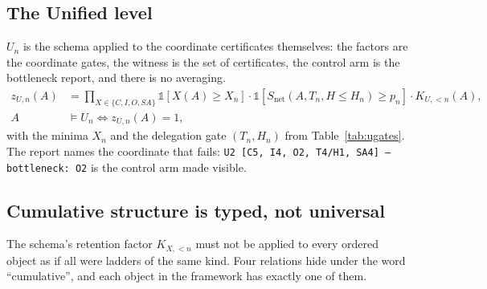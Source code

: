 \subsection{The Unified level}
$U_n$ is the schema applied to the coordinate certificates themselves: the factors are the coordinate gates, the witness is the set of certificates, the control arm is the bottleneck report, and there is no averaging.
\[
\begin{aligned}
z_{U,n}(A) &= \prod_{X \in \{C, I, O, SA\}} \mathds{1}[X(A) \ge X_n] \cdot \mathds{1}[S_{\mathrm{net}}(A, T_n, H \le H_n) \ge p_n] \cdot K_{U,<n}(A),\\
A &\models U_n \iff z_{U,n}(A) = 1,
\end{aligned}
\]
with the minima $X_n$ and the delegation gate $(T_n, H_n)$ from Table~\ref{tab:ugates}. The report names the coordinate that fails: \texttt{U2 [C5, I4, O2, T4/H1, SA4] --- bottleneck: O2} is the control arm made visible.

\subsection{Cumulative structure is typed, not universal}\label{sec:typed}
The schema's retention factor $K_{X,<n}$ must not be applied to every ordered object as if all were ladders of the same kind. Four relations hide under the word ``cumulative'', and each object in the framework has exactly one of them.

